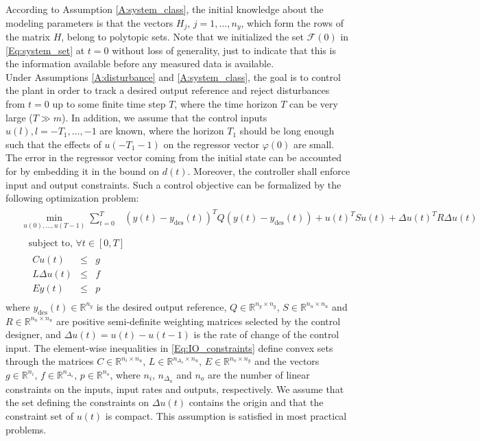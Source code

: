 \documentclass[10 pt, letterpaper]{article}
\newcommand{\ba}{\begin{array}}
\newcommand{\ea}{\end{array}}
\newcommand{\bR}{{\mathbb R}}
\begin{document}
According to Assumption \ref{A:system_class}, the initial knowledge about the modeling parameters is that the vectors $H_j, \, j=1,\hdots, n_y$, which form the rows of the matrix $H$, belong to polytopic sets. Note that we initialized the set $\mathcal{F}(0)$ in \eqref{Eq:system_set} at $t=0$ without loss of generality, just to indicate that this is the information available before any measured data is available.\\
Under Assumptions \ref{A:disturbance} and \ref{A:system_class}, the goal is to control the plant in order to track a desired output reference and reject disturbances from $t=0$ up to some finite time step $T$, where the time horizon $T$ can be very large ($T\gg m$). In addition, we assume that the control inputs $u(l), l=-T_1,\hdots,-1$ are known, where the horizon $T_1$ should be long enough such that the effects of $u(-T_1-1)$ on the regressor vector $\varphi(0)$ are small. The error in the regressor vector coming from the initial state can be accounted for by embedding it in the bound on $d(t)$.  Moreover, the controller shall enforce input and output constraints. Such a control objective can be formalized by the following optimization problem:
\begin{eqnarray}\label{Eq:problem_cost}
&
\begin{aligned}
\min\limits_{u(0),\hdots,u(T-1)}\sum_{t=0}^{T} &\left( y(t)-y_{\text{des}}(t) \right)^TQ \left( y(t)-y_{\text{des}}(t) \right)+u(t)^T S u(t) + \Delta u(t)^T R \Delta u(t) \end{aligned}\\\label{Eq:IO_constraints}
&\begin{aligned}
& \text{subject to},\,\forall t\in[0,T] \\
&\ba{lllll}
Cu(t)&\leq &g\\
L \Delta u(t)&\leq&f\\
E y(t)&\leq& p
\ea
\end{aligned}
\end{eqnarray}
where $y_{\text{des}}(t)\in \bR^{n_y}$ is the desired output reference, $Q \in \bR^{n_y\times n_y}$, $S\in \bR^{n_u\times n_u}$ and $R \in \bR^{n_u \times n_u}$ are positive semi-definite weighting matrices selected by the control designer, and $\Delta u(t)=u(t)-u(t-1)$ is the rate of change of the control input. The element-wise inequalities in \eqref{Eq:IO_constraints} define convex sets through the matrices $C\in\bR^{n_i\times n_u}$, $L\in\bR^{n_{\Delta_u}\times n_u}$, $E\in\bR^{n_o\times n_y}$ and the vectors $g\in\bR^{n_i}$, $f\in\bR^{n_{\Delta_u}}$, $p\in\bR^{n_o}$, where $n_i$, $n_{\Delta_u}$ and $n_o$ are the number of linear constraints on the inputs, input rates and outputs, respectively. We assume that the set defining the constraints on $\Delta u(t)$ contains the origin and that the constraint set of $u(t)$ is compact. This assumption is satisfied in most practical problems.
\end{document}
